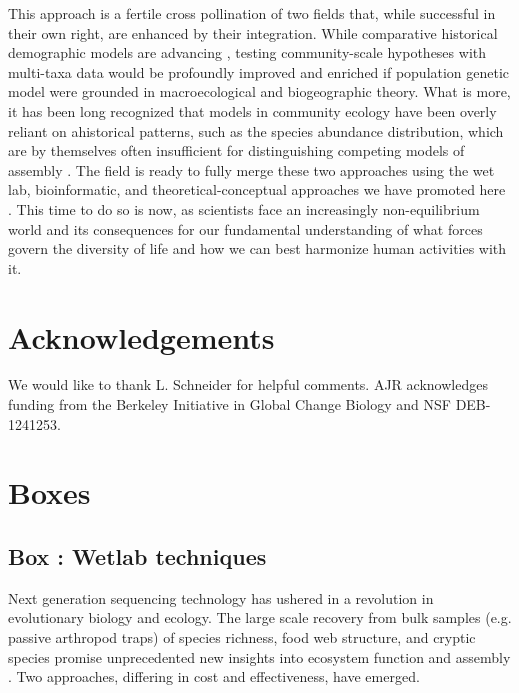 \documentclass[12pt]{article}
\newcounter{Box}
\begin{document}
This approach is a fertile cross pollination of two fields that, while
successful in their own right, are enhanced by their
integration. While comparative historical demographic models are
advancing \citep{xue2015, hickerson2006, carstens2016,
  chan2014}, testing community-scale hypotheses with
multi-taxa data would be profoundly improved and enriched if
population genetic model were grounded in macroecological and
biogeographic theory.  What is more, it has been long recognized that
models in community ecology have been overly reliant on ahistorical
patterns, such as the species abundance distribution, which are by
themselves often insufficient for distinguishing competing models of
assembly \citep{mcgill2007}.  The field is ready to fully merge
these two approaches using the wet lab, bioinformatic, and
theoretical-conceptual approaches we have promoted here . This time to
do so is now, as scientists face an increasingly non-equilibrium world
and its consequences for our fundamental understanding of what forces
govern the diversity of life and how we can best harmonize human
activities with it.

\section*{Acknowledgements}

We would like to thank L. Schneider for helpful comments. AJR
acknowledges funding from the Berkeley Initiative in Global Change
Biology and NSF DEB-1241253.

\pagebreak




\pagebreak

\section*{Boxes}


\label{box:wet}
\subsection*{Box \theBox: Wetlab techniques}
    
Next generation sequencing technology has ushered in a revolution in
evolutionary biology and ecology. The large scale recovery from bulk
samples (e.g. passive arthropod traps) of species richness, food web
structure, and cryptic species promise unprecedented new insights into
ecosystem function and assembly \citep{krehenwinkel2016,
  shokralla2015, gibson2014, taberlet2012}.  Two approaches, differing
in cost and effectiveness, have emerged.
\end{document}
